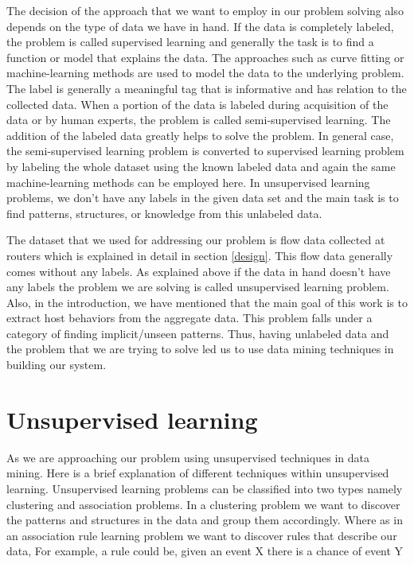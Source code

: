 The decision of the approach that we want to employ in our problem solving also depends on the type of data we have in hand. If the data is completely labeled, the problem is called supervised learning and generally the task is to find a function or model that explains the data. The approaches such as curve fitting or machine-learning methods are used to model the data to the underlying problem. The label is generally a meaningful tag that is informative and has relation to the collected data.  When a portion of the data is labeled during acquisition of the data or by human experts, the problem is called semi-supervised learning. The addition of the labeled data greatly helps to solve the problem. In general case, the semi-supervised learning problem is converted to supervised learning problem by labeling the whole dataset using the known labeled data and again the same machine-learning methods can be employed here. In unsupervised learning problems, we don't have any labels in the given data set and the main task is to find patterns, structures, or knowledge from this unlabeled data.   

The dataset that we used for addressing our problem is flow data collected at routers which is explained in detail in section \ref{design}. This flow data generally comes without any labels. As explained above if the data in hand doesn't have any labels the problem we are solving is called unsupervised learning problem. Also, in the introduction, we have mentioned that the main goal of this work is to extract host behaviors from the aggregate data. This problem falls under a category of finding implicit/unseen patterns. Thus, having unlabeled data and the problem that we are trying to solve led us to use data mining techniques in building our system.

\section{Unsupervised learning}  \label{unsupervised}
As we are approaching our problem using unsupervised techniques in data mining. Here is a brief explanation of different techniques within unsupervised learning. Unsupervised learning problems can be classified into two types namely clustering and association problems. In a clustering problem we want to discover the patterns and structures in the data and group them accordingly. Where as in an association rule learning problem we want to discover rules that describe our data, For example, a rule could be, given an event X there is a chance of event Y happening. Since we aim to find the inherent groupings our focus will be on clustering techniques. Clustering is defined as a process of grouping a set of objects in such a way that objects in the same group (called a cluster) are more similar to each other than to those in other groups (clusters). The similarity can be defined in many ways.

